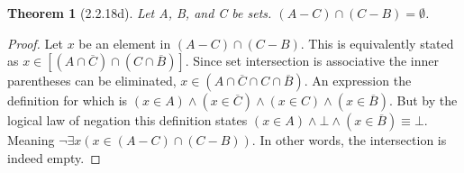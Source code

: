 \documentclass[a4paper, 12pt]{article}
\theoremstyle{plain}
\newtheorem*{theorem*}{Theorem}
\begin{document}
	
	\begin{theorem*}[2.2.18d]
		Let A, B, and C be sets. $(A - C) \cap (C - B) = \emptyset$.
	\end{theorem*}
	
	\begin{proof}
		Let $x$ be an element in $(A - C) \cap (C - B)$. This is equivalently stated as 
		$x \in [(A \cap \overline{C}) \cap (C \cap \overline{B})]$. Since set intersection is 
		associative the inner parentheses can be eliminated, 
		$x \in (A \cap \overline{C} \cap C \cap \overline{B})$. An expression the definition for which 
		is $(x \in A) \land (x \in \overline{C}) \land (x \in C) \land (x \in \overline{B})$. But by the 
		logical law of negation this definition states 
		$(x \in A) \land \bot \land (x \in \overline{B}) \equiv \bot$. Meaning 
		$\lnot \exists x (x \in (A - C) \cap (C - B))$. In other words, the intersection is indeed empty.
	\end{proof}
\end{document}
